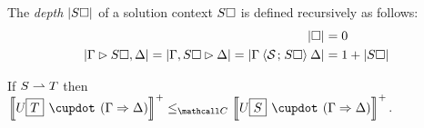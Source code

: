 \begin{definition}
The \emph{depth} $\left|S\square\right|$ of a solution context $S\square$ is defined
recursively as follows:
\begin{align*}
  \left|\square\right| &= 0 \\
  \left|\Gamma \mathbin{\rhd} S\square, \Delta\right| = \left|\Gamma, S\square \mathbin{\rhd} \Delta\right| =
  \left|\Gamma \mathbin{\langle \mathcal{S} \;\!;\!\; S\square \rangle} \Delta\right| &= 1 + \left|S\square\right|
\end{align*}
\end{definition}

\begin{lemma}

  If $S \rightharpoonup T$ then $\psint{U\select{T} \mix (\Gamma \seq \Delta)} \sementC
  \psint{U\select{S} \mix (\Gamma \seq \Delta)}$.
\end{lemma}
